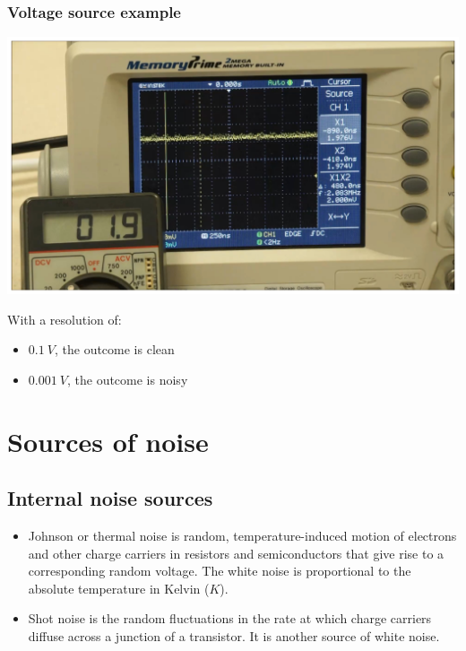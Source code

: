 \documentclass[11pt]{article}
\begin{document}
\subsubsection{Voltage source example}
\label{sec:org605a40c}
\begin{center}
\includegraphics[width=.9\linewidth]{./images/voltage-source-signal.png}
\end{center}

With a resolution of:
\begin{itemize}
\item \(\qty{0.1}{V}\), the outcome is clean
\item \(\qty{0.001}{V}\), the outcome is noisy
\end{itemize}
\section{Sources of noise}
\label{sec:org09979a8}

\subsection{Internal noise sources}
\label{sec:org80402e2}
\begin{itemize}
\item Johnson or thermal noise is random, temperature-induced motion of electrons and other charge carriers in resistors and semiconductors that give rise to a corresponding random voltage. The white noise is proportional to the absolute temperature in Kelvin (\(\unit{K}\)).
\item Shot noise is the random fluctuations in the rate at which charge carriers diffuse across a junction of a transistor. It is another source of white noise.
\end{itemize}

 \newpage
\end{document}
